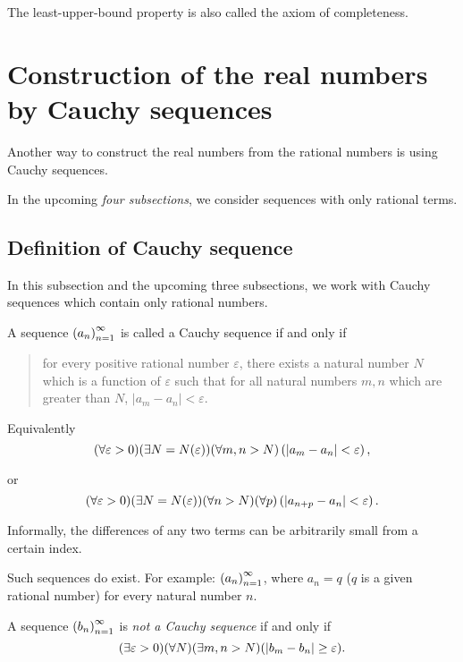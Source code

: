 The least-upper-bound property is also called the axiom of completeness.

\section{Construction of the real numbers by Cauchy sequences}

Another way to construct the real numbers from the rational numbers is using Cauchy sequences.

In the upcoming \textit{four subsections}, we consider sequences with only rational terms.

\subsection{Definition of Cauchy sequence}

In this subsection and the upcoming three subsections, we work with Cauchy sequences which contain only rational numbers.

\begin{definition}
    A sequence ${\left({a_{n}}\right)}^{\infty}_{n=1}$ is called a Cauchy sequence if and only if
    \begin{quotation}
        \noindent for every positive rational number $\varepsilon$, there exists a natural number $N$ which is a function of $\varepsilon$ such that for all natural numbers $m, n$ which are greater than $N$, $\left\vert a_{m} - a_{n}\right\vert < \varepsilon$.
    \end{quotation}

    Equivalently
    \[
        (\forall\varepsilon > 0)(\exists N=N(\varepsilon))(\forall m, n > N)\left(\left\vert{a_{m} - a_{n}}\right\vert < \varepsilon\right),
    \]

    or
    \[
        (\forall\varepsilon > 0)(\exists N=N(\varepsilon))(\forall n > N)(\forall p)\left(\left\vert{a_{n+p} - a_{n}}\right\vert < \varepsilon\right).
    \]
\end{definition}

Informally, the differences of any two terms can be arbitrarily small from a certain index.

\bigskip

Such sequences do exist. For example: ${\left({a_{n}}\right)}^{\infty}_{n=1}$, where $a_{n} = q$ ($q$ is a given rational number) for every natural number $n$.

A sequence ${\left({b_{n}}\right)}^{\infty}_{n=1}$ is \textit{not a Cauchy sequence} if and only if
\[
    (\exists\varepsilon > 0)(\forall N)(\exists m, n > N)(\left\vert{b_{m} - b_{n}}\right\vert\ge\varepsilon).
\]

